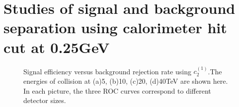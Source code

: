 \documentclass[final,1p,11pt]{elsarticle}
\begin{document}
\section{Studies of signal and background separation using calorimeter hit cut at 0.25GeV}

\begin{figure}
\begin{center}
\end{center}
\caption{Signal efficiency versus background rejection rate using $c_2^{(1)}$.The energies of collision at (a)5, (b)10, (c)20, (d)40TeV are shown here. In each picture, the three ROC curves correspond to different detector sizes.}
\label{fig:rawhit_0.25GeV_c2b1}
\end{figure}
\end{document}
